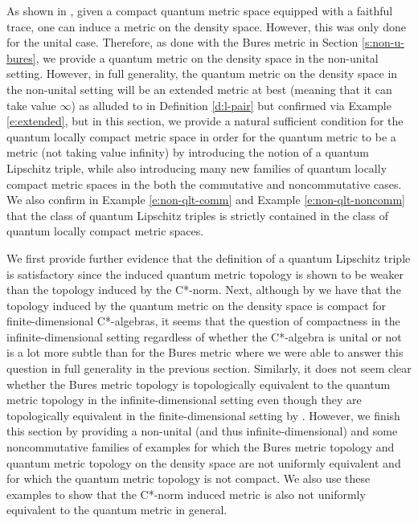 \documentclass{amsart}
\theoremstyle{plain}
\theoremstyle{definition}
\theoremstyle{remark}
\numberwithin{equation}{section}
\begin{document}
As shown in \cite{Aguilar25}, given a compact quantum metric space equipped with a faithful trace, one can induce a metric on the density space. However, this was only done for the unital case. Therefore, as done with the Bures metric in Section \ref{s:non-u-bures}, we provide a quantum metric on the density space in the non-unital setting. However, in full generality, the quantum metric on the density space in the non-unital setting will be an extended metric at best (meaning that it can take value $\infty$) as alluded to in Definition \ref{d:l-pair} but confirmed via Example \ref{e:extended}, but in this section, we  provide a natural sufficient condition for the quantum locally compact metric space in order for the quantum metric to be a metric (not   taking value infinity) by introducing the notion of a quantum Lipschitz triple, while also introducing many new families of quantum locally compact metric spaces in the both the commutative and noncommutative cases. We also confirm in Example \ref{e:non-qlt-comm} and Example \ref{e:non-qlt-noncomm} that the class of quantum Lipschitz triples is strictly contained in the class of quantum locally compact metric spaces.

We first provide further evidence that the definition of a quantum Lipschitz triple is satisfactory since the induced quantum metric topology is shown to be weaker than the topology induced by the C*-norm. Next, although by \cite[Proposition 3.3 and Corollary 3.6]{Aguilar25}  we have that the topology induced by the quantum metric on the density space is compact for finite-dimensional C*-algebras, it seems that the question of compactness in the infinite-dimensional setting regardless of whether the C*-algebra is unital or not is a lot more subtle than for the Bures metric where we were able to answer this question in full generality in the previous section. Similarly, it does not seem clear whether the Bures metric topology is topologically equivalent to the quantum metric topology in the infinite-dimensional setting even though they are topologically equivalent in the finite-dimensional setting by \cite[Corollary 3.6]{Aguilar25}. However, we finish this section by providing a non-unital (and thus infinite-dimensional) and some noncommutative families of examples for which the Bures metric topology and quantum metric topology on the density space are not uniformly equivalent and for which the quantum metric topology is not compact. We also use these examples to show that the C*-norm induced metric is also not uniformly equivalent to the quantum metric in general.
\end{document}
